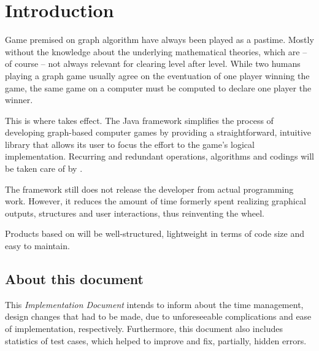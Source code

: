 \section{Introduction}
Game premised on graph algorithm have always been played as a pastime. Mostly without the knowledge about the underlying mathematical theories, which are -- of course -- not always relevant for clearing level after level. While two humans playing a graph game usually agree on the eventuation of one player winning the game, the same game on a computer must be computed to declare one player the winner.\par

This is where \graphioli takes effect. The Java framework simplifies the process of developing graph-based computer games by providing a straightforward, intuitive library that allows its user to focus the effort to the game's logical implementation. Recurring and redundant operations, algorithms and codings will be taken care of by \graphioli.\par

The framework still does not release the developer from actual programming work. However, it reduces the amount of time formerly spent realizing graphical outputs, structures and user interactions, thus reinventing the wheel.\par

Products based on \graphioli will be well-structured, lightweight in terms of code size and easy to maintain.\par

\subsection{About this document}

This \emph{Implementation Document} intends to inform about the time management, design changes that had to be made, due to unforeseeable complications and ease of implementation, respectively. Furthermore, this document also includes statistics of test cases, which helped to improve and fix, partially, hidden errors. 